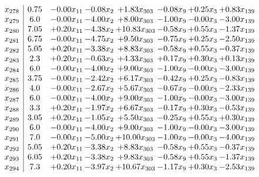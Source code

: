 \documentclass[8pt]{article}
\begin{document}
\[\begin{array}{c| c c@{\hskip 2pt} c@{\hskip 2pt} c@{\hskip 2pt} c@{\hskip 2pt} c@{\hskip 2pt} c@{\hskip 2pt} }
 x_{278}   &  0.75 & -0.00 x_{11} & -0.08 x_{2} & +  1.83 x_{303} & -0.08 x_{9} & +  0.25 x_{3} & +  0.83 x_{139}\\
 x_{279}   &  6.0 & -0.00 x_{11} & -4.00 x_{2} & +  8.00 x_{303} & -1.00 x_{9} & -0.00 x_{3} & -3.00 x_{139}\\
 x_{280}   &  7.05 & +  0.20 x_{11} & -4.38 x_{2} & + 10.83 x_{303} & -0.58 x_{9} & +  0.55 x_{3} & -1.37 x_{139}\\
 x_{281}   &  6.75 & -0.00 x_{11} & -4.75 x_{2} & +  9.50 x_{303} & -0.75 x_{9} & +  0.25 x_{3} & -2.50 x_{139}\\
 x_{282}   &  5.05 & +  0.20 x_{11} & -3.38 x_{2} & +  8.83 x_{303} & -0.58 x_{9} & +  0.55 x_{3} & -0.37 x_{139}\\
 x_{283}   &  2.3 & +  0.20 x_{11} & -0.63 x_{2} & +  4.33 x_{303} & +  0.17 x_{9} & +  0.30 x_{3} & +  0.13 x_{139}\\
 x_{284}   &  6.0 & -0.00 x_{11} & -4.00 x_{2} & +  9.00 x_{303} & -1.00 x_{9} & -0.00 x_{3} & -3.00 x_{139}\\
 x_{285}   &  3.75 & -0.00 x_{11} & -2.42 x_{2} & +  6.17 x_{303} & -0.42 x_{9} & +  0.25 x_{3} & -0.83 x_{139}\\
 x_{286}   &  4.0 & -0.00 x_{11} & -2.67 x_{2} & +  5.67 x_{303} & -0.67 x_{9} & -0.00 x_{3} & -2.33 x_{139}\\
 x_{287}   &  6.0 & -0.00 x_{11} & -4.00 x_{2} & +  9.00 x_{303} & -1.00 x_{9} & -0.00 x_{3} & -3.00 x_{139}\\
 x_{288}   &  3.3 & +  0.20 x_{11} & -1.97 x_{2} & +  6.67 x_{303} & -0.17 x_{9} & +  0.30 x_{3} & -0.53 x_{139}\\
 x_{289}   &  3.05 & +  0.20 x_{11} & -1.05 x_{2} & +  5.50 x_{303} & -0.25 x_{9} & +  0.55 x_{3} & +  0.30 x_{139}\\
 x_{290}   &  6.0 & -0.00 x_{11} & -4.00 x_{2} & +  9.00 x_{303} & -1.00 x_{9} & -0.00 x_{3} & -3.00 x_{139}\\
 x_{291}   &  7.0 & -0.00 x_{11} & -5.00 x_{2} & + 10.00 x_{303} & -1.00 x_{9} & -0.00 x_{3} & -4.00 x_{139}\\
 x_{292}   &  5.05 & +  0.20 x_{11} & -3.38 x_{2} & +  8.83 x_{303} & -0.58 x_{9} & +  0.55 x_{3} & -0.37 x_{139}\\
 x_{293}   &  6.05 & +  0.20 x_{11} & -3.38 x_{2} & +  9.83 x_{303} & -0.58 x_{9} & +  0.55 x_{3} & -1.37 x_{139}\\
 x_{294}   &  7.3 & +  0.20 x_{11} & -3.97 x_{2} & + 10.67 x_{303} & -1.17 x_{9} & +  0.30 x_{3} & -2.53 x_{139}\\

\end{array}\]
\end{document}
